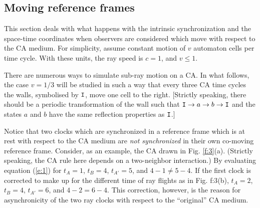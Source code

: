 \documentclass[pra,amsfonts, twocolumn]{revtex4}
\begin{document}
\subsection{Moving reference frames}

This section deals with what happens with the intrinsic
synchronization and the space-time
coordinates when observers are considered which move with respect to the
CA medium. For simplicity, assume constant motion of $v$ automaton cells
per time cycle. With these units, the ray speed is $c=1$, and $v\le 1$.

There are numerous ways to simulate sub-ray motion on a CA. In what
follows, the case $v=1/3$ will be studied in such a way that every three
CA time cycles the walls, symbolised by ${\tt I}$, move one cell to the
right. [Strictly speaking, there should be a periodic transformation of
the wall such that ${\tt I}\rightarrow a\rightarrow b\rightarrow {\tt
I}$ and the states $a$ and $b$ have the same reflection properties as
${\tt I}$.]

Notice that two clocks which
are synchronized in a reference frame which is at rest with respect to
the CA medium are {\em not synchronized} in their own co-moving
reference frame.
Consider, as an example, the CA drawn in Fig.
\ref{f:3}(a). (Strictly speaking, the CA rule here depends on
a two-neighbor interaction.)
  By evaluating equation
(\ref{e:1}) for $t_A=1$, $t_B=4$, $t_{A'}=5$, and $4-1\neq 5-4$.
If the first clock is corrected to make up for the different time of ray
flights as in Fig. {f:3}(b),
$t_A=2$, $t_B=4$, $t_{A'}=6$, and $4-2 = 6-4$.
This correction, however, is the reason for asynchronicity of the two
ray clocks with respect to the ``original'' CA medium.
\end{document}
